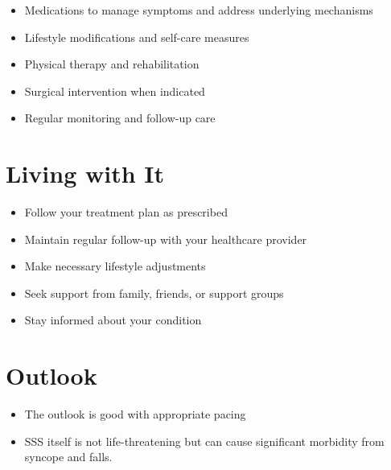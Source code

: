 \begin{itemize}[noitemsep]
  \item Medications to manage symptoms and address underlying mechanisms
  \item Lifestyle modifications and self-care measures
  \item Physical therapy and rehabilitation
  \item Surgical intervention when indicated
  \item Regular monitoring and follow-up care
\end{itemize}
\section{Living with It}
\begin{itemize}[noitemsep]
  \item Follow your treatment plan as prescribed
  \item Maintain regular follow-up with your healthcare provider
  \item Make necessary lifestyle adjustments
  \item Seek support from family, friends, or support groups
  \item Stay informed about your condition
\end{itemize}
\section{Outlook}
\begin{itemize}[noitemsep]
  \item The outlook is good with appropriate pacing
  \item SSS itself is not life-threatening but can cause significant morbidity from syncope and falls.
\end{itemize}
